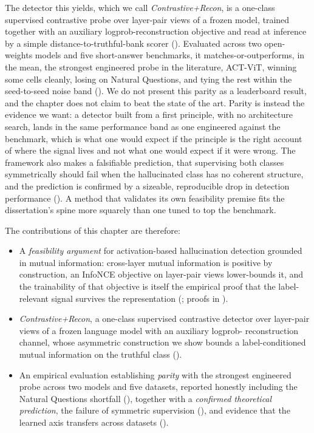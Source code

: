The detector this yields, which we call \emph{Contrastive+Recon}, is a one-class
supervised contrastive probe over layer-pair views of a frozen model, trained
together with an auxiliary logprob-reconstruction objective and read at inference
by a simple distance-to-truthful-bank scorer (). Evaluated
across two open-weights models and five short-answer benchmarks, it
matches-or-outperforms, in the mean, the strongest engineered probe in the
literature, ACT-ViT, winning some cells cleanly, losing on Natural Questions, and
tying the rest within the seed-to-seed noise band (). We do
not present this parity as a leaderboard result, and the chapter does not claim to
beat the state of the art. Parity is instead the evidence we want: a detector
built from a first principle, with no architecture search, lands in the same
performance band as one engineered against the benchmark, which is what one would
expect if the principle is the right account of where the signal lives and not
what one would expect if it were wrong. The framework also makes a falsifiable
prediction, that supervising both classes symmetrically should fail when the
hallucinated class has no coherent structure, and the prediction is confirmed by
a sizeable, reproducible drop in detection performance ().
A method that validates its own feasibility premise fits the dissertation's
spine more squarely than one tuned to top the benchmark.

The contributions of this chapter are therefore:
\begin{itemize}
  \item A \emph{feasibility argument} for activation-based hallucination detection
  grounded in mutual information: cross-layer mutual information is positive by
  construction, an InfoNCE objective on layer-pair views lower-bounds it, and the
  trainability of that objective is itself the empirical proof that the
  label-relevant signal survives the representation
  (; proofs in ).
  \item \emph{Contrastive+Recon}, a one-class supervised contrastive detector over
  layer-pair views of a frozen language model with an auxiliary logprob-
  reconstruction channel, whose asymmetric construction we show bounds a
  label-conditioned mutual information on the truthful class
  ().
  \item An empirical evaluation establishing \emph{parity} with the strongest
  engineered probe across two models and five datasets, reported honestly
  including the Natural Questions shortfall (), together with
  a \emph{confirmed theoretical prediction}, the failure of symmetric supervision
  (), and evidence that the learned axis transfers across
  datasets ().
\end{itemize}

